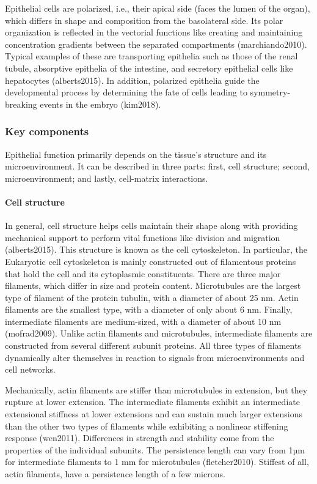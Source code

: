 \documentclass[
]{article}
\begin{document}
Epithelial cells are polarized, i.e., their apical side (faces the lumen
of the organ), which differs in shape and composition from the
basolateral side. Its polar organization is reflected in the vectorial
functions like creating and maintaining concentration gradients between
the separated compartments (marchiando2010). Typical examples of these
are transporting epithelia such as those of the renal tubule, absorptive
epithelia of the intestine, and secretory epithelial cells like
hepatocytes (alberts2015). In addition, polarized epithelia guide the
developmental process by determining the fate of cells leading to
symmetry-breaking events in the embryo (kim2018).

\hypertarget{key-components}{%
\subsubsection{Key components}\label{key-components}}

Epithelial function primarily depends on the tissue's structure and its
microenvironment. It can be described in three parts: first, cell
structure; second, microenvironment; and lastly, cell-matrix
interactions.

\hypertarget{cell-structure}{%
\paragraph{Cell structure}\label{cell-structure}}

In general, cell structure helps cells maintain their shape along with
providing mechanical support to perform vital functions like division
and migration (alberts2015). This structure is known as the cell
cytoskeleton. In particular, the Eukaryotic cell cytoskeleton is mainly
constructed out of filamentous proteins that hold the cell and its
cytoplasmic constituents. There are three major filaments, which differ
in size and protein content. Microtubules are the largest type of
filament of the protein tubulin, with a diameter of about 25 nm. Actin
filaments are the smallest type, with a diameter of only about 6 nm.
Finally, intermediate filaments are medium-sized, with a diameter of
about 10 nm (mofrad2009). Unlike actin filaments and microtubules,
intermediate filaments are constructed from several different subunit
proteins. All three types of filaments dynamically alter themselves in
reaction to signals from microenvironments and cell networks.

Mechanically, actin filaments are stiffer than microtubules in
extension, but they rupture at lower extension. The intermediate
filaments exhibit an intermediate extensional stiffness at lower
extensions and can sustain much larger extensions than the other two
types of filaments while exhibiting a nonlinear stiffening response
(wen2011). Differences in strength and stability come from the
properties of the individual subunits. The persistence length can vary
from 1µm for intermediate filaments to 1 mm for microtubules
(fletcher2010). Stiffest of all, actin filaments, have a persistence
length of a few microns.
\end{document}
